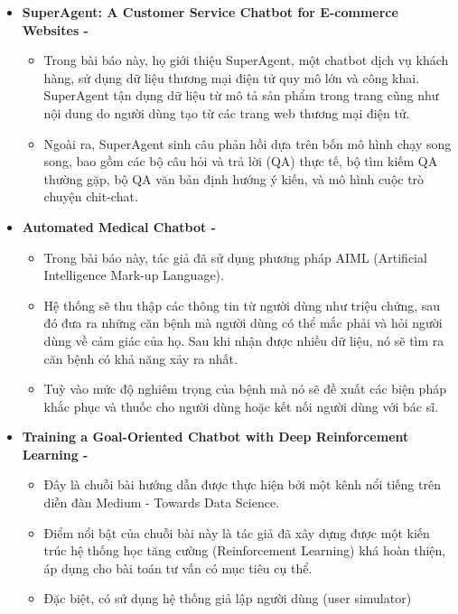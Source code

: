 \begin{itemize}
    \item \textbf{SuperAgent: A Customer Service Chatbot for E-commerce Websites - \cite{superagent}}
    \begin{itemize}
        \item Trong bài báo này, họ giới thiệu SuperAgent, một chatbot dịch vụ khách hàng,
        sử dụng dữ liệu thương mại điện tử quy mô lớn và công khai.
        SuperAgent tận dụng dữ liệu từ mô tả sản phẩm trong trang cũng như
        nội dung do người dùng tạo từ các trang web thương mại điện tử.
        \item Ngoài ra, SuperAgent sinh câu phản hồi dựa trên bốn mô hình chạy song song,
        bao gồm các bộ câu hỏi và trả lời (QA) thực tế, bộ tìm kiếm QA thường gặp,
        bộ QA văn bản định hướng ý kiến, và mô hình cuộc trò chuyện chit-chat.
    \end{itemize}
    \item \textbf{Automated Medical Chatbot - \cite{automatedmedical}}
    \begin{itemize}
        \item Trong bài báo này, tác giả đã sử dụng phương pháp AIML
        (Artificial Intelligence Mark-up Language).
        \item Hệ thống sẽ thu thập các thông tin từ người dùng như triệu chứng,
        sau đó đưa ra những căn bệnh mà người dùng có thể mắc phải và
        hỏi người dùng về cảm giác của họ. Sau khi nhận được nhiều dữ liệu,
        nó sẽ tìm ra căn bệnh có khả năng xảy ra nhất.
        \item Tuỳ vào mức độ nghiêm trọng của bệnh mà nó sẽ đề xuất các biện pháp
        khắc phục và thuốc cho người dùng hoặc kết nối người dùng với bác sĩ.
    \end{itemize}
    \item \textbf{Training a Goal-Oriented Chatbot with Deep Reinforcement Learning
    - \cite{traininggochatbot}}
    \begin{itemize}
        \item Đây là chuỗi bài hướng dẫn được thực hiện bởi
        một kênh nổi tiếng trên diễn đàn Medium - Towards Data Science.
        \item Điểm nổi bật của chuỗi bài này là tác giả đã xây dựng được
        một kiến trúc hệ thống học tăng cường (Reinforcement Learning)
        khá hoàn thiện, áp dụng cho bài toán tư vấn có mục tiêu cụ thể.
        \item Đặc biệt, có sử dụng hệ thống giả lập người dùng (user simulator)

\end{itemize}
\end{itemize}
